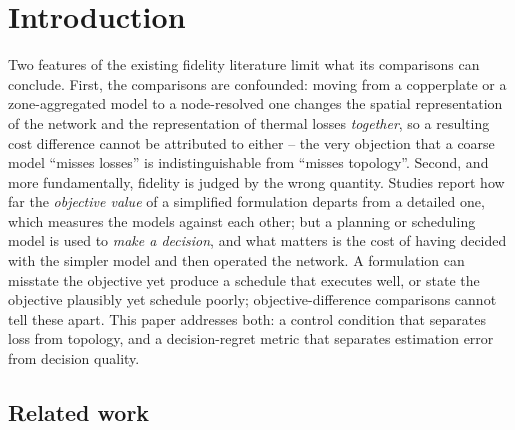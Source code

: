 \documentclass[a4paper,fleqn]{cas-dc}
\begin{document}
\maketitle

\section{Introduction}
\label{sec:introduction}

Two features of the existing fidelity literature limit what its comparisons can
conclude. First, the comparisons are confounded: moving from a copperplate or a
zone-aggregated model to a node-resolved one changes the spatial representation of the
network and the representation of thermal losses \emph{together}, so a resulting cost
difference cannot be attributed to either -- the very objection that a coarse model
``misses losses'' is indistinguishable from ``misses topology''. Second, and more
fundamentally, fidelity is judged by the wrong quantity. Studies report how far the
\emph{objective value} of a simplified formulation departs from a detailed one, which
measures the models against each other; but a planning or scheduling model is used to
\emph{make a decision}, and what matters is the cost of having decided with the simpler
model and then operated the network. A formulation can misstate the objective yet
produce a schedule that executes well, or state the objective plausibly yet schedule
poorly; objective-difference comparisons cannot tell these apart. This paper addresses
both: a control condition that separates loss from topology, and a decision-regret
metric that separates estimation error from decision quality.

\subsection{Related work}

\end{document}
